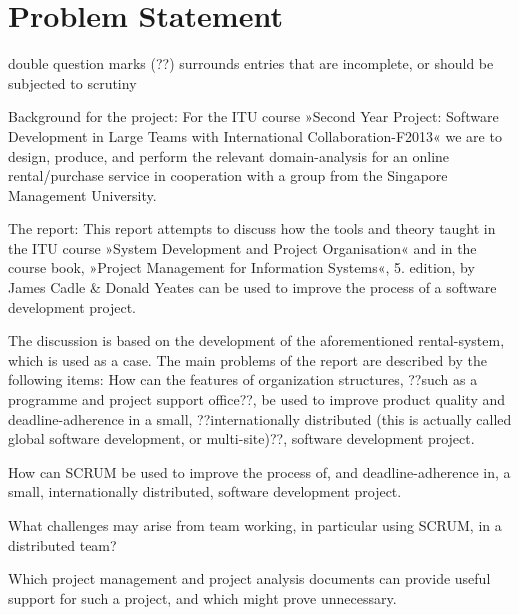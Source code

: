 \section{Problem Statement}
\label{sec:problemstatement}
double question marks (??) surrounds entries that are incomplete, or should be
subjected to scrutiny

Background for the project:
For the ITU course »Second Year Project: Software Development in Large Teams with
International Collaboration-F2013«
we are to design, produce, and perform the relevant domain-analysis for
an online rental/purchase service in cooperation with a group from the Singapore
Management University.

The report:
This report attempts to discuss how the tools and theory taught in the
ITU course »System Development and Project Organisation« and in the
course book, »Project Management for Information Systems«, 5. edition, by 
James Cadle \& Donald Yeates can be used to improve the process of a software development project.

The discussion is based on the development of the aforementioned
rental-system, which is used as a case.
The main problems of the report are described by the following items:
How can the features of organization structures, ??such as a
programme and project support office??, be used to improve
product quality and deadline-adherence in a small,
??internationally distributed (this is actually called global
software development, or multi-site)??,  software development project.

How can SCRUM be used to improve the process of, and 
deadline-adherence in, a small, internationally distributed,
software development project.

What challenges may arise from team working, in particular
using SCRUM, in a distributed team?

Which project management and project analysis documents can
provide useful support for such a project, and which might
prove unnecessary.
